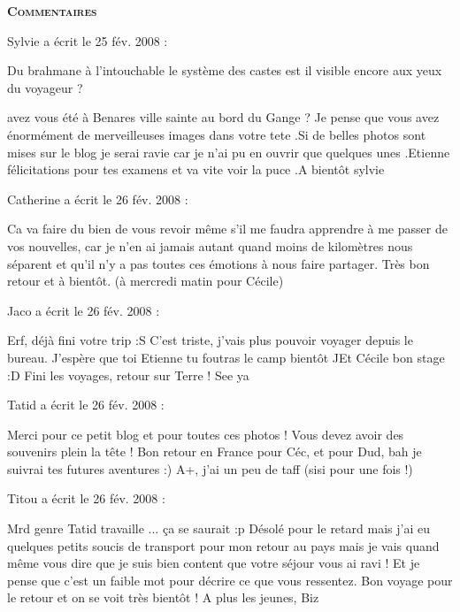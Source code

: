 \bigskip
\textbf{\textsc{Commentaires}}

 \medskip
Sylvie a écrit le 25 fév. 2008 :
\begin{displayquote}
Du brahmane à l'intouchable le système des castes est il visible encore aux yeux du voyageur ?

avez vous été à Benares ville sainte au bord du Gange ?	Je pense que vous avez énormément de merveilleuses images dans votre tete .Si de belles photos sont mises sur le blog je serai ravie car je n'ai pu en ouvrir que quelques unes .Etienne félicitations pour tes examens et va vite voir la puce .A bientôt sylvie
\end{displayquote}

 \medskip
Catherine a écrit le 26 fév. 2008 :
\begin{displayquote}
Ca va faire du bien de vous revoir même s'il me faudra apprendre à me passer de vos nouvelles, car je n'en ai jamais autant quand moins de kilomètres nous séparent et qu'il n'y a pas toutes ces émotions à nous faire partager.
         Très bon retour et à bientôt. (à mercredi matin pour Cécile)
\end{displayquote}

 \medskip
Jaco a écrit le 26 fév. 2008 :
\begin{displayquote}
Erf, déjà fini votre trip :S C'est triste, j'vais plus pouvoir voyager depuis le bureau.
J'espère que toi Etienne tu foutras le camp bientôt ^^
Et Cécile bon stage :D Fini les voyages, retour sur Terre !
See ya
\end{displayquote}

 \medskip
Tatid a écrit le 26 fév. 2008 :
\begin{displayquote}
Merci pour ce petit blog et pour toutes ces photos ! Vous devez avoir des souvenirs plein la tête !
Bon retour en France pour Céc, et pour Dud, bah je suivrai tes futures aventures :)
A+, j'ai un peu de taff (sisi pour une fois !)
\end{displayquote}

 \medskip
Titou a écrit le 26 fév. 2008 :
\begin{displayquote}
Mrd genre Tatid travaille ... ça se saurait :p
Désolé pour le retard mais j'ai eu quelques petits soucis de transport pour mon retour au pays mais je vais quand même vous dire que je suis bien content que votre séjour vous ai ravi ! Et je pense que c'est un faible mot pour décrire ce que vous ressentez. Bon voyage pour le retour et on se voit très bientôt !
A plus les jeunes, Biz
\end{displayquote}

